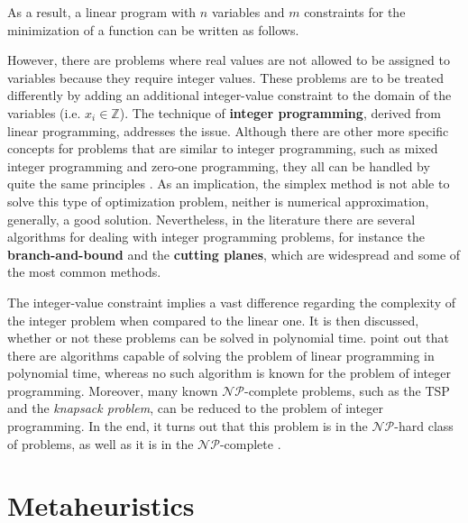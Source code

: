 \documentclass[tuberlin,cic,tc,openright,english,noabntcite,oneside]{iiufrgs}
\begin{document}
As a result, a linear program with $n$ variables and $m$ constraints for the minimization of a function can be written as follows.

However, there are problems where real values are not allowed to be assigned to variables because they require integer values. These problems are to be treated differently by adding an additional integer-value constraint to the domain of the variables (i.e. $x_{i} \in \mathbb{Z}$). The technique of \textbf{integer programming}, derived from linear programming, addresses the issue. Although there are other more specific concepts for problems that are similar to integer programming, such as mixed integer programming and zero-one programming, they all can be handled by quite the same principles \parencite[p. 175]{shenoy_linear_2007}. As an implication, the simplex method is not able to solve this type of optimization problem, neither is numerical approximation, generally, a good solution. Nevertheless, in the literature there are several algorithms for dealing with integer programming problems, for instance the \textbf{branch-and-bound} and the \textbf{cutting planes}, which are widespread and some of the most common methods.

The integer-value constraint implies a vast difference regarding the complexity of the integer problem when compared to the linear one. It is then discussed, whether or not these problems can be solved in polynomial time. \textcite{wolsey_integer_2014} point out that there are algorithms capable of solving the problem of linear programming in polynomial time, whereas no such algorithm is known for the problem of integer programming. Moreover, many known $\mathcal{NP}$-complete problems, such as the TSP and the \emph{knapsack problem}, can be reduced to the problem of integer programming. In the end, it turns out that this problem is in the $\mathcal{NP}$-hard class of problems, as well as it is in the $\mathcal{NP}$-complete \parencite[p. 21]{schrijver_theory_1998}.

\section{Metaheuristics}
\end{document}
